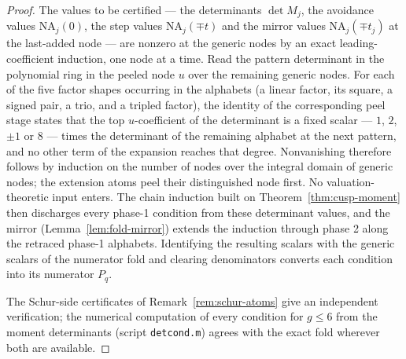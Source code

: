 \begin{proof}
\leanok
The values to be certified --- the determinants $\det M_j$, the avoidance values
$\mathrm{NA}_j(0)$, the step values $\mathrm{NA}_j(\mp t)$ and the mirror values
$\mathrm{NA}_j(\mp t_j)$ at the last-added node --- are nonzero at the generic nodes by
an exact leading-coefficient induction, one node at a time. Read the pattern determinant
in the polynomial ring in the peeled node $u$ over the remaining generic nodes. For each
of the five factor shapes occurring in the alphabets (a linear factor, its square, a
signed pair, a trio, and a tripled factor), the identity of the corresponding peel stage
states that the top $u$-coefficient of the determinant is a fixed scalar --- $1$, $2$,
$\pm 1$ or $8$ --- times the determinant of the remaining alphabet at the next pattern,
and no other term of the expansion reaches that degree. Nonvanishing therefore follows
by induction on the number of nodes over the integral domain of generic nodes; the
extension atoms peel their distinguished node first. No valuation-theoretic input
enters. The chain induction built on Theorem~\ref{thm:cusp-moment} then discharges
every phase-1 condition from these determinant values, and the mirror
(Lemma~\ref{lem:fold-mirror}) extends the induction through phase 2 along the retraced
phase-1 alphabets. Identifying the resulting scalars with the generic scalars of the
numerator fold and clearing denominators converts each condition into its numerator
$P_q$.

The Schur-side certificates of Remark~\ref{rem:schur-atoms} give an independent
verification; the numerical computation of every condition for $g \le 6$ from the moment determinants
(script \texttt{detcond.m}) agrees with the exact fold wherever both are available.
\end{proof}


